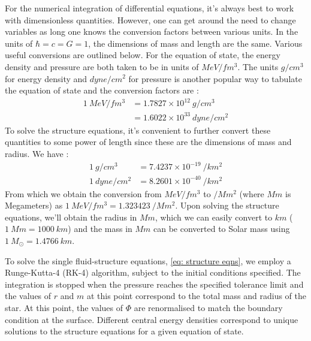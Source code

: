 \documentclass[a4paper,12pt,onehalfspacing]{report}
\begin{document}
For the numerical integration of differential equations, it's always best to work with dimensionless quantities. However, one can get around the need to change variables as long one knows the conversion factors between various units. In the units of $\hbar=c=G=1$, the dimensions of mass and length are the same. Various useful conversions are outlined below. 
For the equation of state, the energy density and pressure are both taken to be in units of $MeV/fm^3$. The units $g/cm^3$ for energy density and $dyne/cm^2$ for pressure is another popular way to tabulate the equation of state and the conversion factors are \cite{Glendenning}:
\begin{align*}
    1\ MeV/fm^3 &= 1.7827\times 10^{12}\ g/cm^3\\
    &= 1.6022\times 10^{33}\ dyne/cm^2
\end{align*}
To solve the structure equations, it's convenient to further convert these quantities to some power of length since these are the dimensions of mass and radius. We have \cite{Glendenning}:
\begin{align*}
    1\  g/cm^3&= 7.4237 \times 10^{-19}\  /km^2\\
    1\  dyne/cm^2 &= 8.2601 \times 10^{-40}\  /km^2
\end{align*}
From which we obtain the conversion from $MeV/fm^3$ to $/Mm^2$ (where $Mm$ is Megameters) as $1\  MeV/fm^3= 1.323423\ /Mm^2$. Upon solving the structure equations, we'll obtain the radius in $Mm$, which we can easily convert to $km$ ($1\ Mm= 1000\ km$) and the mass in $Mm$ can be converted to Solar mass using \cite{Glendenning} $1\ M_\odot = 1.4766\  km$. 

To solve the single fluid-structure equations, \cref{eq: structure eqns}, we employ a Runge-Kutta-4 (RK-4) algorithm, subject to the initial conditions specified. The integration is stopped when the pressure reaches the specified tolerance limit and the values of $r$ and $m$ at this point correspond to the total mass and radius of the star. At this point, the values of $\Phi$ are renormalised to match the boundary condition at the surface. Different central energy densities correspond to unique solutions to the structure equations for a given equation of state. 
\end{document}
